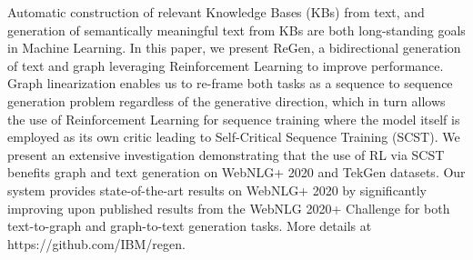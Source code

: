 Automatic construction of relevant Knowledge Bases (KBs) from text, and generation of semantically meaningful text from KBs are both long-standing goals in Machine Learning. In this paper, we present ReGen, a bidirectional generation of text and graph leveraging Reinforcement Learning to improve performance. Graph linearization enables us to re-frame both tasks as a sequence to sequence generation problem regardless of the generative direction, which in turn allows the use of Reinforcement Learning for sequence training where the model itself  is employed as its own critic leading to Self-Critical Sequence Training (SCST). We present an extensive investigation demonstrating that the use of RL via SCST benefits graph and text generation on WebNLG+ 2020 and TekGen datasets. Our system provides state-of-the-art results on WebNLG+ 2020 by significantly improving upon published results from the WebNLG 2020+ Challenge for both text-to-graph and graph-to-text generation tasks. More details at https://github.com/IBM/regen.
